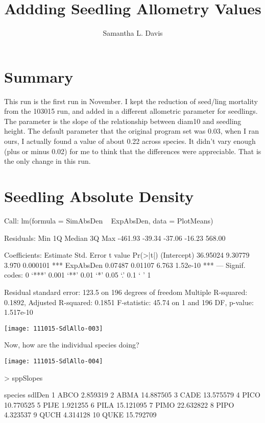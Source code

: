 \documentclass{article}
\begin{document}


\title{Addding Seedling Allometry Values}
\author{Samantha L. Davis}

\maketitle

\section{Summary}
This run is the first run in November. I kept the reduction of seed/ling mortality from the 103015 run, and added in a different allometric parameter for seedlings. The parameter is the slope of the relationship between diam10 and seedling height. The default parameter that the original program set was 0.03, when I ran ours, I actually found a value of about 0.22 across species. It didn't vary enough (plus or minus 0.02) for me to think that the differences were appreciable. That is the only change in this run.





\newpage

\section{Seedling Absolute Density}
\begin{Schunk}
\begin{Soutput}
Call:
lm(formula = SimAbsDen ~ ExpAbsDen, data = PlotMeans)

Residuals:
    Min      1Q  Median      3Q     Max 
-461.93  -39.34  -37.06  -16.23  568.00 

Coefficients:
            Estimate Std. Error t value Pr(>|t|)    
(Intercept) 36.95024    9.30779   3.970 0.000101 ***
ExpAbsDen    0.07487    0.01107   6.763 1.52e-10 ***
---
Signif. codes:  0 ‘***’ 0.001 ‘**’ 0.01 ‘*’ 0.05 ‘.’ 0.1 ‘ ’ 1

Residual standard error: 123.5 on 196 degrees of freedom
Multiple R-squared:  0.1892,	Adjusted R-squared:  0.1851 
F-statistic: 45.74 on 1 and 196 DF,  p-value: 1.517e-10
\end{Soutput}
\end{Schunk}
\texttt{[image: 111015-SdlAllo-003]}

Now, how are the individual species doing?

\texttt{[image: 111015-SdlAllo-004]}
\begin{Schunk}
\begin{Sinput}
>   sppSlopes
\end{Sinput}
\begin{Soutput}
   species    sdlDen
1     ABCO  2.859319
2     ABMA 14.887505
3     CADE 13.575579
4     PICO 10.770525
5     PIJE  1.921255
6     PILA 15.121095
7     PIMO 22.632822
8     PIPO  4.323537
9     QUCH  4.314128
10    QUKE 15.792709
\end{Soutput}
\end{Schunk}
\end{document}
